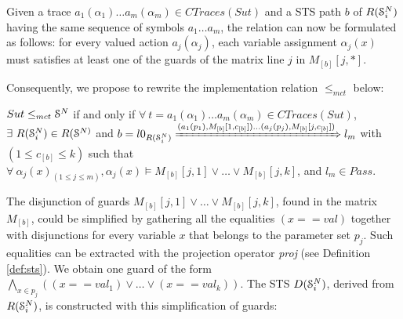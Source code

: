 Given a trace $a_1(\alpha_1) \dots a_m(\alpha_m) \in
CTraces({Sut})$ and a STS path $b$ of $R(\EuScript{S}_i^{N})$
having the same sequence of symbols $a_1 \dots a_m$, the relation
can now be formulated as follows: for every valued action
$a_j(\alpha_j)$, each variable assignment $\alpha_j(x)$ must
satisfies at least one of the guards of the matrix line $j$ in
$M_{[b]}[j,*]$.

Consequently, we propose to rewrite the implementation relation
$\leq_{mct}$ below:

\begin{proposition}
    ${Sut} \leq_{mct} \EuScript{S}^{N}$ if and only if
    $\forall ~t = a_1(\alpha_1) \dots a_m(\alpha_m) \in
    CTraces({Sut})$, $\exists ~R(\EuScript{S}_i^{N}) \in
    R(\EuScript{S}^{N)}$ and
    $b = l0_{R(\EuScript{S}_i^{N})}
    \xRightarrow{(a_1(p_1),M_{[b]}[1,c_{[b]}]) \dots (a_j(p_j),M_{[b]}[j,c_{[b]}])}
    l_m$
    with $(1 \leq c_{[b]} \leq k)$ such that $\forall
    ~\alpha_j(x)_{(1 \leq j \leq m)}, \alpha_j(x) \models
    M_{[b]}[j,1] \vee \dots \vee  M_{[b]}[j,k]$, and $l_m \in Pass$.
\end{proposition}

The disjunction of guards $M_{[b]}[j,1] \vee \dots \vee
M_{[b]}[j,k]$, found in the matrix $M_{[b]}$, could be simplified
by gathering all the equalities $(x == val)$ together with
disjunctions for every variable $x$ that belongs to the parameter
set $p_j$. Such equalities can be extracted with the projection
operator \textit{proj} (see Definition \ref{def:sts}). We obtain
one guard of the form $\displaystyle \bigwedge_{x \in p_j} ((x ==
val_1) \vee \dots \vee (x == val_k))$. The STS
$D(\EuScript{S}_i^{N})$, derived from $R(\EuScript{S}_i^{N})$, is
constructed with this simplification of guards:


